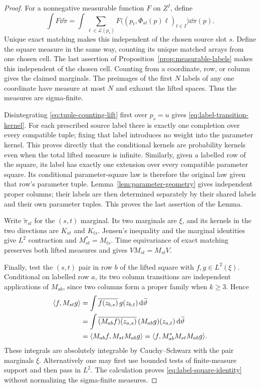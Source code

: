 \begin{proof}
For a nonnegative measurable function $F$ on $Z^I$, define
\begin{equation}\label{eq:tuple-counting-lift}
 \int F\dd\widetilde\pi
 =\int\sum_{\ell\in\mathcal L(p_s)}
 F\bigl((p_t,\Phi_{st}(p)\ell)_{t\in I}\bigr)\dd\pi(p).
\end{equation}
Unique exact matching makes this independent of the chosen source
slot $s$. Define the square measure in the same way, counting its
unique matched arrays from one chosen cell. The last assertion of
Proposition~\ref{prop:measurable-labels} makes this independent of
the chosen cell. Counting from a coordinate, row, or column gives
the claimed marginals. The preimages of the first $N$ labels of any
one coordinate have measure at most $N$ and exhaust the lifted
spaces. Thus the measures are sigma-finite.

Disintegrating \eqref{eq:tuple-counting-lift} first over $p_s=u$
gives \eqref{eq:label-transition-kernel}. For each prescribed source
label there is exactly one completion over every compatible tuple;
fixing that label introduces no weight into the parameter kernel.
This proves directly that the conditional kernels are probability
kernels even when the total lifted measure is infinite.
Similarly, given a labelled row of the square, its label has exactly
one extension over every compatible parameter square. Its conditional
parameter-square law is therefore the original law given that row's
parameter tuple. Lemma~\ref{lem:parameter-geometry} gives independent
proper columns; their labels are then determined separately by their
shared labels and their own parameter tuples. This proves the last
assertion of the Lemma.

Write $\widetilde\pi_{st}$ for the $(s,t)$ marginal.
Its two marginals are $\xi$, and its kernels in the two directions
are $K_{st}$ and $K_{ts}$. Jensen's inequality and the marginal
identities give $L^2$ contraction and $M_{st}^*=M_{ts}$.
Time equivariance of exact matching preserves both lifted measures
and gives $VM_{st}=M_{st}V$.

Finally, test the $(s,t)$ pair in row $b$ of the lifted square with
$f,g\in L^2(\xi)$. Conditional on labelled row $a$, its two column
transitions are independent applications of $M_{ab}$, since two
columns form a proper family when $k\ge3$. Hence
\begin{align*}
 \langle f,M_{st}g\rangle
 &=\int\overline{f(z_{b,s})}\,g(z_{b,t})
                              \,\mathrm d\widetilde\vartheta\\
 &=\int\overline{(M_{ab}f)(z_{a,s})}\,
                  (M_{ab}g)(z_{a,t})\,\mathrm d\widetilde\vartheta\\
 &=\langle M_{ab}f,M_{st}M_{ab}g\rangle
  =\langle f,M_{ab}^*M_{st}M_{ab}g\rangle.
\end{align*}
These integrals are absolutely integrable by Cauchy--Schwarz with
the pair marginals $\xi$. Alternatively one may first use bounded
tests of finite-measure support and then pass in $L^2$.
The calculation proves \eqref{eq:label-square-identity} without
normalizing the sigma-finite measures.
\end{proof}

